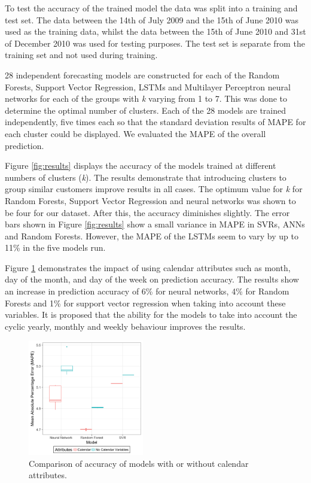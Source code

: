 To test the accuracy of the trained model the data was split into a training and test set. The data between the 14th of July 2009 and the 15th of June 2010 was used as the training data, whilst the data between the 15th of June 2010 and 31st of December 2010 was used for testing purposes. The test set is separate from the training set and not used during training. 

28 independent forecasting models are constructed for each of the Random Forests, Support Vector Regression, LSTMs and Multilayer Perceptron neural networks for each of the groups with \textit{k} varying from 1 to 7. This was done to determine the optimal number of clusters.  Each of the 28 models are trained independently, five times each so that the standard deviation results of MAPE for each cluster could be displayed. We evaluated the MAPE of the overall prediction. 

Figure \ref{fig:results} displays the accuracy of the models trained at different numbers of clusters (\textit{k}). The results demonstrate that introducing clusters to group similar customers improve results in all cases. The optimum value for \textit{k} for Random Forests, Support Vector Regression and neural networks was shown to be four for our dataset. After this, the accuracy diminishes slightly. The error bars shown in Figure \ref{fig:results} show a small variance in MAPE in SVRs, ANNs and Random Forests. However, the MAPE of the LSTMs seem to vary by up to 11\% in the five models run. 

Figure \ref{fig:calendar_attr} demonstrates the impact of using calendar attributes such as month, day of the month, and day of the week on prediction accuracy. The results show an increase in prediction accuracy of 6\% for neural networks, 4\% for Random Forests and 1\% for support vector regression when taking into account these variables. It is proposed that the ability for the models to take into account the cyclic yearly, monthly and weekly behaviour improves the results.

\begin{figure}
	\includegraphics[width=0.45\textwidth]{figures/calendar_attr.png}
	\caption{Comparison of accuracy of models with or without calendar attributes.}
	\label{fig:calendar_attr}
\end{figure}



